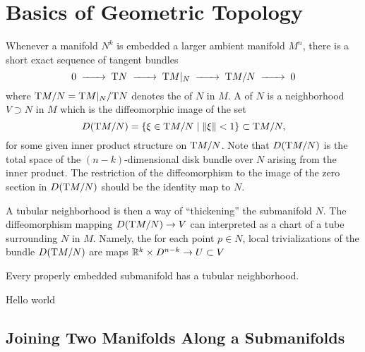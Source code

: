 \pagebreak
\section{Basics of Geometric Topology}\label{sec:geometric-topology}

Whenever a manifold $N^k$ is embedded a larger ambient manifold $M^n$, there is a short exact sequence of tangent bundles
\begin{equation}
	0 \lkxto \T N\lkxto \T M|_N \lkxto \T M/N \lkxto 0
\end{equation}
where $\mathrm{T} M/N=\mathrm{T} M|_N / \mathrm{T} N$ denotes the  of $N$ in $M$. A  of $N$ is a neighborhood $V\supset N$ in $M$ which is the diffeomorphic image of the set
\begin{equation}
	D(\mathrm{T} M/N) = \{\xi \in \mathrm{T} M/N \mid \|\xi\| <1 \}\subset \mathrm{T} M/N,
\end{equation}
for some given inner product structure on $\mathrm{T} M/N$. Note that $D(\mathrm{T} M/N)$ is the total space of the $(n-k)$-dimensional disk bundle over $N$ arising from the inner product. The restriction of the diffeomorphism to the image of the zero section in $D(\mathrm{T} M/N)$ should be the identity map to $N$.

A tubular neighborhood is then a way of ``thickening'' the submanifold $N$.
The diffeomorphism mapping $D(\mathrm{T} M/N) \to V$ can interpreted as a chart of a tube surrounding $N$ in $M$. Namely, the for each point $p\in N$, local trivializations of the bundle $D(\mathrm{T} M/N)$ are maps $\mathbb{R}^k \times D^{n-k}\to U\subset V$


\begin{theorem}
	Every properly embedded submanifold has a tubular neighborhood.
\end{theorem}

\begin{theorem}
	Hello world
\end{theorem}


\subsection{Joining Two Manifolds Along a Submanifolds}

